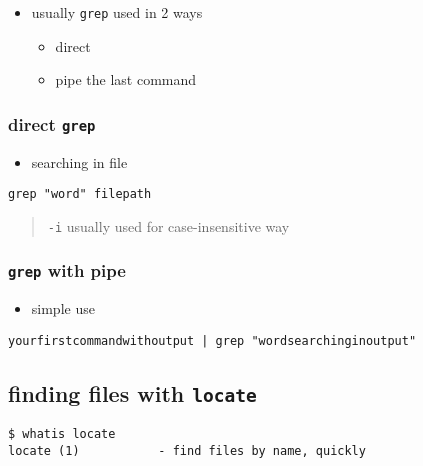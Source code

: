 \documentclass[
]{article}
\providecommand{\tightlist}{%
  \setlength{\itemsep}{0pt}\setlength{\parskip}{0pt}}
\begin{document}
\begin{itemize}
\tightlist
\item
  usually \texttt{grep} used in 2 ways

  \begin{itemize}
  \tightlist
  \item
    direct
  \item
    pipe the last command
  \end{itemize}
\end{itemize}

\hypertarget{direct-grep}{%
\subsubsection{\texorpdfstring{direct
\texttt{grep}}{direct grep}}\label{direct-grep}}

\begin{itemize}
\tightlist
\item
  searching in file
\end{itemize}

\begin{verbatim}
grep "word" filepath
\end{verbatim}

\begin{quote}
\texttt{-i} usually used for case-insensitive way
\end{quote}

\hypertarget{grep-with-pipe}{%
\subsubsection{\texorpdfstring{\texttt{grep} with
pipe}{grep with pipe}}\label{grep-with-pipe}}

\begin{itemize}
\tightlist
\item
  simple use
\end{itemize}

\begin{verbatim}
yourfirstcommandwithoutput | grep "wordsearchinginoutput"
\end{verbatim}

\hypertarget{finding-files-with-locate}{%
\subsection{\texorpdfstring{finding files with
\texttt{locate}}{finding files with locate}}\label{finding-files-with-locate}}

\begin{verbatim}
$ whatis locate
locate (1)           - find files by name, quickly
\end{verbatim}
\end{document}
